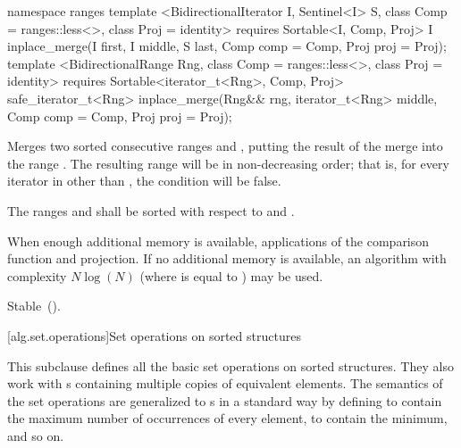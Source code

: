 \begin{addedblock}
%
\begin{itemdecl}
namespace ranges {
  template <BidirectionalIterator I, Sentinel<I> S, class Comp = ranges::less<>,
            class Proj = identity>
      requires Sortable<I, Comp, Proj>
    I inplace_merge(I first, I middle, S last, Comp comp = Comp{}, Proj proj = Proj{});
  template <BidirectionalRange Rng, class Comp = ranges::less<>, class Proj = identity>
      requires Sortable<iterator_t<Rng>, Comp, Proj>
    safe_iterator_t<Rng> inplace_merge(Rng&& rng, iterator_t<Rng> middle, Comp comp = Comp{},
                                       Proj proj = Proj{});
}
\end{itemdecl}

\begin{itemdescr}
\pnum
\effects
Merges two sorted consecutive ranges
and
,
putting the result of the merge into the range
.
The resulting range will be in non-decreasing order;
that is, for every iterator
in
other than
,
the condition
will be false.

\pnum
\requires
The ranges  and  shall be
sorted with respect to  and .

\pnum
\returns {}

\pnum
\complexity
When enough additional memory is available,
applications of the comparison function and projection.
If no additional memory is available, an algorithm with complexity
$N \log(N)$
(where
is equal to
)
may be used.

\pnum
\remarks Stable~().
\end{itemdescr}
\end{addedblock}

[alg.set.operations]{Set operations on sorted structures}

\pnum
This subclause defines all the basic set operations on sorted structures.
They also work with
s
containing multiple copies of equivalent elements.
The semantics of the set operations are generalized to
s
in a standard way by defining
to contain the maximum number of occurrences of every element,
to contain the minimum, and so on.

